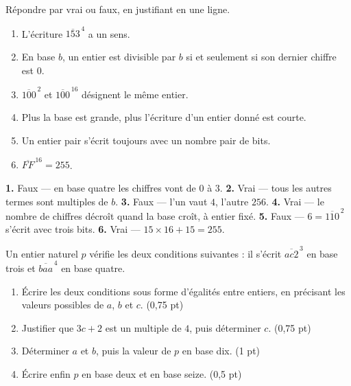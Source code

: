 \begin{jemeteste}
Répondre par vrai ou faux, en justifiant en une ligne.

\begin{enumerate}[label=\textbf{\arabic*.}, leftmargin=*, itemsep=0.28em]
  \item L'écriture $\overline{153}^{\,4}$ a un sens.
  \item En base $b$, un entier est divisible par $b$ si et seulement si son
        dernier chiffre est $0$.
  \item $\overline{100}^{\,2}$ et $\overline{100}^{\,16}$ désignent le même
        entier.
  \item Plus la base est grande, plus l'écriture d'un entier donné est courte.
  \item Un entier pair s'écrit toujours avec un nombre pair de bits.
  \item $\overline{FF}^{\,16} = 255$.
\end{enumerate}
\end{jemeteste}

\begin{corrige}[je me teste]
\textbf{1.} Faux — en base quatre les chiffres vont de $0$ à $3$.
\textbf{2.} Vrai — tous les autres termes sont multiples de $b$.
\textbf{3.} Faux — l'un vaut $4$, l'autre $256$.
\textbf{4.} Vrai — le nombre de chiffres décroît quand la base croît, à entier
fixé.
\textbf{5.} Faux — $6 = \overline{110}^{\,2}$ s'écrit avec trois bits.
\textbf{6.} Vrai — $15\times16+15 = 255$.
\end{corrige}

\begin{commeaubac}
Un entier naturel $p$ vérifie les deux conditions suivantes : il s'écrit
$\overline{ac2}^{\,3}$ en base trois et $\overline{baa}^{\,4}$ en base quatre.

\begin{enumerate}[label=\textbf{\arabic*.}, leftmargin=*, itemsep=0.25em]
  \item Écrire les deux conditions sous forme d'égalités entre entiers, en
        précisant les valeurs possibles de $a$, $b$ et $c$.
        \hfill\textup{(0,75 pt)}
  \item Justifier que $3c+2$ est un multiple de $4$, puis déterminer $c$.
        \hfill\textup{(0,75 pt)}
  \item Déterminer $a$ et $b$, puis la valeur de $p$ en base dix.
        \hfill\textup{(1 pt)}
  \item Écrire enfin $p$ en base deux et en base seize.
        \hfill\textup{(0,5 pt)}
\end{enumerate}
\end{commeaubac}

